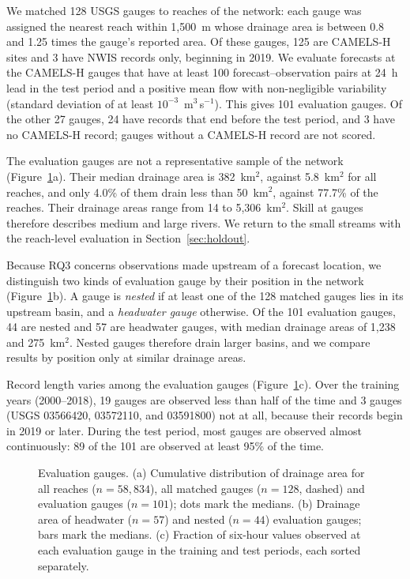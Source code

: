 We matched 128 USGS gauges to reaches of the network: each gauge was assigned the nearest reach within 1,500~m whose drainage area is between 0.8 and 1.25 times the gauge's reported area. Of these gauges, 125 are CAMELS-H sites and 3 have NWIS records only, beginning in 2019. We evaluate forecasts at the CAMELS-H gauges that have at least 100 forecast--observation pairs at 24~h lead in the test period and a positive mean flow with non-negligible variability (standard deviation of at least $10^{-3}$~m$^3$\,s$^{-1}$). This gives 101 evaluation gauges. Of the other 27 gauges, 24 have records that end before the test period, and 3 have no CAMELS-H record; gauges without a CAMELS-H record are not scored.

The evaluation gauges are not a representative sample of the network (Figure~\ref{fig:gauges}a). Their median drainage area is 382~km$^2$, against 5.8~km$^2$ for all reaches, and only 4.0\% of them drain less than 50~km$^2$, against 77.7\% of the reaches. Their drainage areas range from 14 to 5,306~km$^2$. Skill at gauges therefore describes medium and large rivers. We return to the small streams with the reach-level evaluation in Section~\ref{sec:holdout}.

Because RQ3 concerns observations made upstream of a forecast location, we distinguish two kinds of evaluation gauge by their position in the network (Figure~\ref{fig:gauges}b). A gauge is \emph{nested} if at least one of the 128 matched gauges lies in its upstream basin, and a \emph{headwater gauge} otherwise. Of the 101 evaluation gauges, 44 are nested and 57 are headwater gauges, with median drainage areas of 1,238 and 275~km$^2$. Nested gauges therefore drain larger basins, and we compare results by position only at similar drainage areas.

Record length varies among the evaluation gauges (Figure~\ref{fig:gauges}c). Over the training years (2000--2018), 19 gauges are observed less than half of the time and 3 gauges (USGS 03566420, 03572110, and 03591800) not at all, because their records begin in 2019 or later. During the test period, most gauges are observed almost continuously: 89 of the 101 are observed at least 95\% of the time.

\begin{figure}
\caption{Evaluation gauges. (a) Cumulative distribution of drainage area for all reaches ($n = 58{,}834$), all matched gauges ($n = 128$, dashed) and evaluation gauges ($n = 101$); dots mark the medians. (b) Drainage area of headwater ($n = 57$) and nested ($n = 44$) evaluation gauges; bars mark the medians. (c) Fraction of six-hour values observed at each evaluation gauge in the training and test periods, each sorted separately.}
\label{fig:gauges}
\end{figure}

